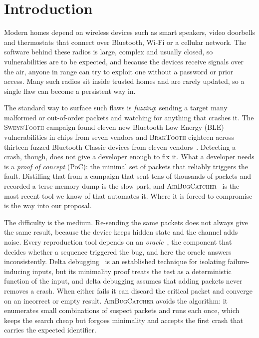 \section{Introduction}

Modern homes depend on wireless devices such as smart speakers, video doorbells
and thermostats that connect over Bluetooth, Wi-Fi or a cellular network. The
software behind these radios is large, complex and usually closed, so
vulnerabilities are to be expected, and because the devices receive signals over
the air, anyone in range can try to exploit one without a password or prior
access. Many such radios sit inside trusted homes and are rarely updated, so a
single flaw can become a persistent way in.

The standard way to surface such flaws is \emph{fuzzing}: sending a target many
malformed or out-of-order packets and watching for anything that crashes it. The
\textsc{SweynTooth} campaign found eleven new Bluetooth Low Energy (BLE) vulnerabilities
in chips from seven vendors and \textsc{BrakTooth} eighteen across thirteen fuzzed Bluetooth
Classic devices from eleven vendors~\cite{sweyntooth2020,braktooth2022}. Detecting a crash, though, does not
give a developer enough to fix it. What a developer needs is a
\emph{proof of concept} (PoC): the minimal set of packets that reliably triggers
the fault. Distilling that from a campaign that sent tens of thousands of packets
and recorded a terse memory dump is the slow part, and
\textsc{AirBugCatcher}~\cite{airbugcatcher2024} is the most recent tool we know
of that automates it. Where it is forced to compromise is the way into our
proposal.

The difficulty is the medium. Re-sending the same packets does not always give
the same result, because the device keeps hidden state and the channel adds
noise. Every reproduction tool depends on an \emph{oracle}~\cite{oracleproblem2015},
the component that decides whether a sequence triggered the bug, and here the
oracle answers inconsistently. Delta debugging~\cite{ddmin2002} is an established
technique for isolating failure-inducing inputs, but its minimality proof treats
the test as a deterministic function of the input, and delta debugging assumes
that adding packets never removes a crash. When either fails it can discard the
critical packet and converge on
an incorrect or empty result. \textsc{AirBugCatcher} avoids the algorithm: it
enumerates small combinations of suspect packets and runs each once, which keeps
the search cheap but forgoes minimality and accepts the first crash that carries the expected identifier.

